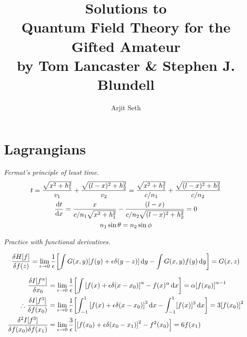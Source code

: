 \documentclass{report}
\begin{document}
\title{Solutions to \\ Quantum Field Theory for the Gifted Amateur \\ by Tom Lancaster \& Stephen J. Blundell}

\author{Arjit Seth}

\maketitle


\chapter{Lagrangians}

\begin{subquests}
	\item \emph{Fermat's principle of least time.}
	\begin{gather*}
		t = \frac{\sqrt{x^2 + h_1^2}}{v_1} + \frac{\sqrt{(l-x)^2+h_2^2}}{v_2} = \frac{\sqrt{x^2 + h_1^2}}{c/n_1} + \frac{\sqrt{(l-x)^2+h_2^2}}{c/n_2} \\
		\dv{t}{x} = \frac{x}{c/n_1\sqrt{x^2 + h_1^2}} - \frac{(l-x)}{c/n_2\sqrt{(l-x)^2 + h_2^2}} = 0 \\
		n_1\sin\theta = n_2\sin\phi
	\end{gather*}
	
	\item \emph{Practice with functional derivatives.}
	\begin{subquests}
		\item
		\begin{gather*}
			\fdv{H[f]}{f(z)} = \lim_{\epsilon \to 0} \frac{1}{\epsilon}\bqty{\int G(x,y)[f(y) + \epsilon\delta(y-z)]\dd{y} - \int G(x,y)f(y)\dd{y}} = G(x,z) \\
	 	\end{gather*}

	 	\item
	 	\begin{align*}
	 		\fdv{I[f^{\alpha}]}{x_0} & =  \lim_{\epsilon \to 0} \frac{1}{\epsilon}\bqty{\int \bqty{f(x) + \epsilon\delta(x - x_0)}^{\alpha} - f(x)^{\alpha} \dd{x}} = \alpha\bqty{f(x_0)}^{\alpha-1}\\ 
	 		\therefore \fdv{I[f^3]}{f(x_0)} & =  \lim_{\epsilon \to 0} \frac{1}{\epsilon}\bqty{\int_{-1}^1 \bqty{f(x) + \epsilon\delta(x-x_0)}^3\dd{x} -\int_{-1}^1 [f(x)]^3 \dd{x}} = 3\bqty{f(x_0)}^2 \\
			\frac{\delta^2 I[f^3]}{\delta f(x_0)\delta f(x_1)} & = \lim_{\epsilon \to 0} \frac{3}{\epsilon}\bqty{\bqty{f(x_0) + \epsilon\delta(x_0 - x_1)}^2 - f^2(x_0)} =  6f(x_1) \\
	 	\end{align*}


\end{subquests}
\end{subquests}
\end{document}

